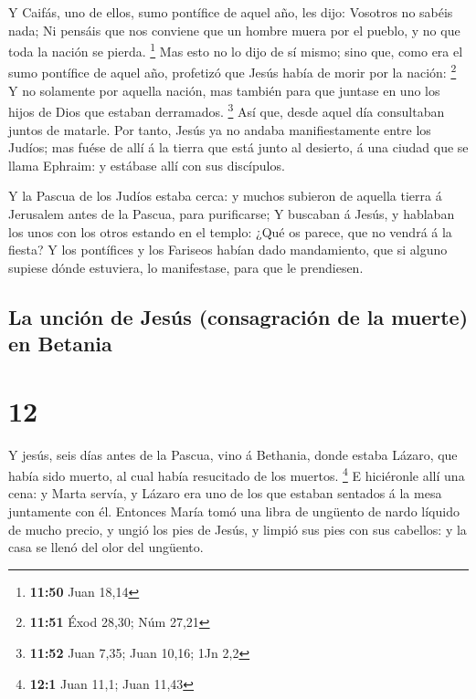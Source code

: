  Y Caifás, uno de ellos, sumo pontífice de aquel año, les
dijo: Vosotros no sabéis nada;  Ni pensáis que nos conviene
que un hombre muera por el pueblo, y no que toda la nación se pierda.
\footnote{\textbf{11:50} Juan 18,14}  Mas esto no lo dijo
de sí mismo; sino que, como era el sumo pontífice de aquel año,
profetizó que Jesús había de morir por la nación: \footnote{\textbf{11:51}
  Éxod 28,30; Núm 27,21}  Y no solamente por aquella
nación, mas también para que juntase en uno los hijos de Dios que
estaban derramados. \footnote{\textbf{11:52} Juan 7,35; Juan 10,16; 1Jn
  2,2}  Así que, desde aquel día consultaban juntos de
matarle.  Por tanto, Jesús ya no andaba manifiestamente
entre los Judíos; mas fuése de allí á la tierra que está junto al
desierto, á una ciudad que se llama Ephraim: y estábase allí con sus
discípulos.

 Y la Pascua de los Judíos estaba cerca: y muchos subieron
de aquella tierra á Jerusalem antes de la Pascua, para purificarse;
 Y buscaban á Jesús, y hablaban los unos con los otros
estando en el templo: ¿Qué os parece, que no vendrá á la fiesta?
 Y los pontífices y los Fariseos habían dado mandamiento,
que si alguno supiese dónde estuviera, lo manifestase, para que le
prendiesen.

\hypertarget{la-unciuxf3n-de-jesuxfas-consagraciuxf3n-de-la-muerte-en-betania}{%
\subsection{La unción de Jesús (consagración de la muerte) en
Betania}\label{la-unciuxf3n-de-jesuxfas-consagraciuxf3n-de-la-muerte-en-betania}}

\hypertarget{section-11}{%
\section{12}\label{section-11}}

 Y jesús, seis días antes de la Pascua, vino á Bethania,
donde estaba Lázaro, que había sido muerto, al cual había resucitado de
los muertos. \footnote{\textbf{12:1} Juan 11,1; Juan 11,43} 
E hiciéronle allí una cena: y Marta servía, y Lázaro era uno de los que
estaban sentados á la mesa juntamente con él.  Entonces
María tomó una libra de ungüento de nardo líquido de mucho precio, y
ungió los pies de Jesús, y limpió sus pies con sus cabellos: y la casa
se llenó del olor del ungüento.

